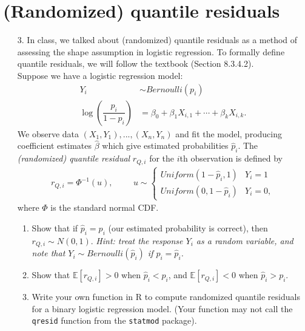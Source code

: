 \documentclass[11pt]{article}
\begin{document}
\section*{(Randomized) quantile residuals}

\begin{enumerate}
\item[3.] In class, we talked about (randomized) quantile residuals as a method of assessing the shape assumption in logistic regression. To formally define quantile residuals, we will follow the textbook (Section 8.3.4.2).\\

Suppose we have a logistic regression model:
\begin{align*}
Y_i & \sim Bernoulli(p_i) \\
\log \left( \dfrac{p_i}{1 - p_i} \right) &= \beta_0 + \beta_1 X_{i,1} + \cdots + \beta_k X_{i,k}.
\end{align*}
We observe data $(X_1, Y_1), ..., (X_n, Y_n)$ and fit the model, producing coefficient estimates $\widehat{\beta}$ which give estimated probabilities $\widehat{p}_i$. The \textit{(randomized) quantile residual} $r_{Q,i}$ for the $i$th observation is defined by
\begin{align*}
r_{Q, i} = \Phi^{-1}(u), \hspace{1cm} u \sim \begin{cases}
Uniform(1 - \widehat{p}_i, 1) & Y_i = 1 \\
Uniform(0, 1 - \widehat{p}_i) & Y_i = 0,
\end{cases}
\end{align*}
where $\Phi$ is the standard normal CDF.

\begin{enumerate}
\item Show that if $\widehat{p}_i = p_i$ (our estimated probability is correct), then $r_{Q,i} \sim N(0, 1)$. \textit{Hint: treat the response $Y_i$ as a random variable, and note that $Y_i \sim Bernoulli(\widehat{p}_i)$ if $p_i = \widehat{p}_i$.}

\item Show that $\mathbb{E}[r_{Q,i}] > 0$ when $\widehat{p}_i < p_i$, and $\mathbb{E}[r_{Q,i}] < 0$ when $\widehat{p}_i > p_i$.

\item Write your own function in R to compute randomized quantile residuals for a binary logistic regression model. (Your function may not call the \texttt{qresid} function from the \texttt{statmod} package).


\end{enumerate}
\end{enumerate}
\end{document}

